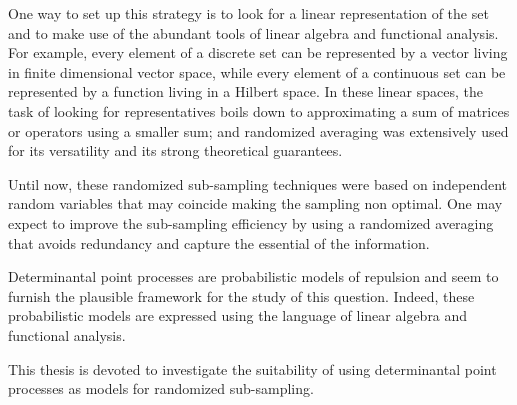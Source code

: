 \documentclass[twoside,11pt]{book}
\numberwithin{theorem}{chapter}
\numberwithin{definition}{chapter}
\numberwithin{proposition}{chapter}
\numberwithin{corollary}{chapter}
\numberwithin{example}{chapter}
\numberwithin{lemma}{chapter}
\numberwithin{assumption}{chapter}
\begin{document}
One way to set up this strategy is to look for a linear representation of the set and to make use of the abundant tools of linear algebra and functional analysis. For example, every element of a discrete set can be represented by a vector living in finite dimensional vector space, while every element of a continuous set can be represented by a function living in a Hilbert space. In these linear spaces, the task of looking for representatives boils down to approximating a sum of matrices or operators using a smaller sum; and randomized averaging was extensively used for its versatility and its strong theoretical guarantees. 


Until now, these randomized sub-sampling techniques were based on independent random variables that may coincide making the sampling non optimal. One may expect to improve the sub-sampling efficiency by using a randomized averaging that avoids redundancy and capture the essential of the information.


Determinantal point processes are probabilistic models of repulsion and seem to furnish the plausible framework for the study of this question. Indeed, these probabilistic models are expressed using the language of linear algebra and functional analysis.



This thesis is devoted to investigate the suitability of using determinantal point processes as models for randomized sub-sampling.




\end{document}
